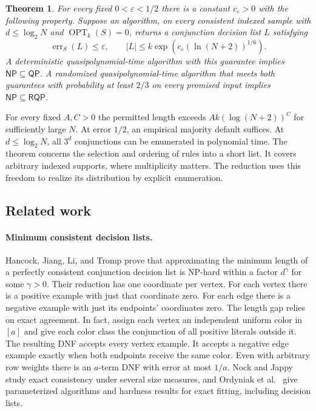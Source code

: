 \documentclass[11pt]{article}
\newtheorem{theorem}{Theorem}
\newcommand{\err}{\operatorname{err}}
\newcommand{\OPT}{\operatorname{OPT}}
\newcommand{\QP}{\mathsf{QP}}
\newcommand{\RQP}{\mathsf{RQP}}
\newcommand{\NP}{\mathsf{NP}}
\begin{document}
\begin{theorem}\label{thm:main}
For every fixed $0<\varepsilon<1/2$ there is a constant $c_\varepsilon>0$
with the following property. Suppose an algorithm, on every consistent indexed
sample with $d\le\log_2N$ and $\OPT_k(S)=0$, returns a conjunction decision list
$L$ satisfying
\[
  \err_S(L)\le\varepsilon,\qquad
  |L|\le k\exp\!\left(c_\varepsilon(\ln(N+2))^{1/6}\right).
\]
A deterministic quasipolynomial-time algorithm with this guarantee implies
$\NP\subseteq\QP$. A randomized quasipolynomial-time algorithm that meets both
guarantees with probability at least $2/3$ on every promised input implies
$\NP\subseteq\RQP$.
\end{theorem}

For every fixed $A,C>0$ the permitted length exceeds $Ak(\log(N+2))^C$
for sufficiently large $N$. At error $1/2$, an empirical majority default
suffices. At $d\le\log_2N$, all $3^d$ conjunctions can be enumerated in
polynomial time. The theorem concerns the selection and ordering of rules
into a short list. It covers arbitrary indexed supports, where
multiplicity matters. The reduction uses this freedom to realize its
distribution by explicit enumeration.

\subsection{Related work}

\paragraph{Minimum consistent decision lists.}
Hancock, Jiang, Li, and Tromp \cite[Section 4]{HJLT} prove that approximating
the minimum length of a perfectly consistent conjunction decision list is
NP-hard within a factor $d^\gamma$ for some $\gamma>0$. Their reduction has
one coordinate per vertex. For each vertex there is a positive example with
just that coordinate zero. For each edge there is a negative example with
just its endpoints' coordinates zero. The length
gap relies on exact agreement. In fact, assign each vertex an independent
uniform color in $[a]$ and give each color class the conjunction of all
positive literals outside it. The resulting DNF accepts every vertex example.
It accepts a negative edge example exactly when both endpoints receive the
same color. Even with arbitrary row weights there is an $a$-term DNF with
error at most $1/a$. Nock and Jappy \cite{NJ} study exact consistency under
several size measures, and Ordyniak et al.\ \cite{OPRS} give parameterized
algorithms and hardness results for exact fitting, including decision lists.
\end{document}
